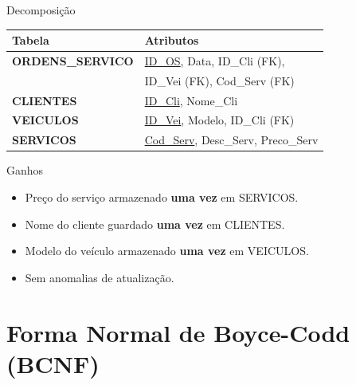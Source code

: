 \documentclass[9pt]{beamer}
\begin{document}
\begin{frame}


    \begin{block}{Decomposição}
    \tiny
    \begin{tabular}{|l|l|}
    \hline
    \textbf{Tabela}     & \textbf{Atributos} \\ \hline
    \textbf{ORDENS\_SERVICO} & \underline{ID\_OS}, Data, ID\_Cli (FK), \\ & ID\_Vei (FK), Cod\_Serv (FK) \\ \hline
    \textbf{CLIENTES}   & \underline{ID\_Cli}, Nome\_Cli \\ \hline
    \textbf{VEICULOS}   & \underline{ID\_Vei}, Modelo, ID\_Cli (FK) \\ \hline
    \textbf{SERVICOS}   & \underline{Cod\_Serv}, Desc\_Serv, Preco\_Serv \\ \hline
    \end{tabular}
    \end{block}

    \vspace{0.2cm}
    \begin{exampleblock}{Ganhos}
    \tiny
    \begin{itemize}
      \item Preço do serviço armazenado \textbf{uma vez} em SERVICOS.
      \item Nome do cliente guardado \textbf{uma vez} em CLIENTES.
      \item Modelo do veículo armazenado \textbf{uma vez} em VEICULOS.
      \item Sem anomalias de atualização.
    \end{itemize}
    \end{exampleblock}
  \end{frame}

\section{Forma Normal de Boyce-Codd (BCNF)}
\end{document}
